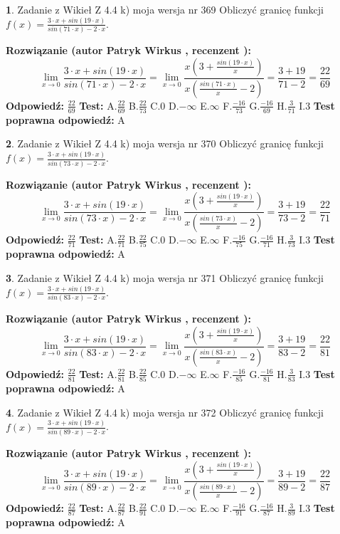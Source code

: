 \documentclass[12pt, a4paper]{article}
\theoremstyle{definition} %
\newtheorem{zad}{}
\newcommand{\zadStart}[1]{\begin{zad}#1\newline}
\newcommand{\zadStop}{\end{zad}}
\newcommand{\rozwStart}[2]{\noindent \textbf{Rozwiązanie (autor #1 , recenzent #2): }\newline}
\newcommand{\rozwStop}{\newline}
\newcommand{\odpStart}{\noindent \textbf{Odpowiedź:}\newline}
\newcommand{\odpStop}{\newline}
\newcommand{\testStart}{\noindent \textbf{Test:}\newline}
\newcommand{\testStop}{\newline}
\newcommand{\kluczStart}{\noindent \textbf{Test poprawna odpowiedź:}\newline}
\newcommand{\kluczStop}{\newline}
\begin{document}
\zadStart{Zadanie z Wikieł Z 4.4 k) moja wersja nr 369}
Obliczyć granicę funkcji $f(x)=\frac{3\cdot x +sin(19\cdot x)}{sin(71\cdot x) -2\cdot x}$.
\zadStop
\rozwStart{Patryk Wirkus}{}
$$\lim\limits_{x\to 0}\frac{3\cdot x +sin(19\cdot x)}{sin(71\cdot x) -2\cdot x}
=\lim\limits_{x\to 0}\frac{x(3+\frac{sin(19\cdot x)}{x})}{x(\frac{sin(71\cdot x)}{x}-2)}
=\frac{3+19}{71-2} = \frac{22}{69}$$
\rozwStop
\odpStart
$\frac{22}{69}$
\odpStop
\testStart
A.$\frac{22}{69}$
B.$\frac{22}{73}$
C.$0$
D.$-\infty$
E.$\infty$
F.$\frac{-16}{73}$
G.$\frac{-16}{69}$
H.$\frac{3}{71}$
I.$3$
\testStop
\kluczStart
A
\kluczStop



\zadStart{Zadanie z Wikieł Z 4.4 k) moja wersja nr 370}
Obliczyć granicę funkcji $f(x)=\frac{3\cdot x +sin(19\cdot x)}{sin(73\cdot x) -2\cdot x}$.
\zadStop
\rozwStart{Patryk Wirkus}{}
$$\lim\limits_{x\to 0}\frac{3\cdot x +sin(19\cdot x)}{sin(73\cdot x) -2\cdot x}
=\lim\limits_{x\to 0}\frac{x(3+\frac{sin(19\cdot x)}{x})}{x(\frac{sin(73\cdot x)}{x}-2)}
=\frac{3+19}{73-2} = \frac{22}{71}$$
\rozwStop
\odpStart
$\frac{22}{71}$
\odpStop
\testStart
A.$\frac{22}{71}$
B.$\frac{22}{75}$
C.$0$
D.$-\infty$
E.$\infty$
F.$\frac{-16}{75}$
G.$\frac{-16}{71}$
H.$\frac{3}{73}$
I.$3$
\testStop
\kluczStart
A
\kluczStop



\zadStart{Zadanie z Wikieł Z 4.4 k) moja wersja nr 371}
Obliczyć granicę funkcji $f(x)=\frac{3\cdot x +sin(19\cdot x)}{sin(83\cdot x) -2\cdot x}$.
\zadStop
\rozwStart{Patryk Wirkus}{}
$$\lim\limits_{x\to 0}\frac{3\cdot x +sin(19\cdot x)}{sin(83\cdot x) -2\cdot x}
=\lim\limits_{x\to 0}\frac{x(3+\frac{sin(19\cdot x)}{x})}{x(\frac{sin(83\cdot x)}{x}-2)}
=\frac{3+19}{83-2} = \frac{22}{81}$$
\rozwStop
\odpStart
$\frac{22}{81}$
\odpStop
\testStart
A.$\frac{22}{81}$
B.$\frac{22}{85}$
C.$0$
D.$-\infty$
E.$\infty$
F.$\frac{-16}{85}$
G.$\frac{-16}{81}$
H.$\frac{3}{83}$
I.$3$
\testStop
\kluczStart
A
\kluczStop



\zadStart{Zadanie z Wikieł Z 4.4 k) moja wersja nr 372}
Obliczyć granicę funkcji $f(x)=\frac{3\cdot x +sin(19\cdot x)}{sin(89\cdot x) -2\cdot x}$.
\zadStop
\rozwStart{Patryk Wirkus}{}
$$\lim\limits_{x\to 0}\frac{3\cdot x +sin(19\cdot x)}{sin(89\cdot x) -2\cdot x}
=\lim\limits_{x\to 0}\frac{x(3+\frac{sin(19\cdot x)}{x})}{x(\frac{sin(89\cdot x)}{x}-2)}
=\frac{3+19}{89-2} = \frac{22}{87}$$
\rozwStop
\odpStart
$\frac{22}{87}$
\odpStop
\testStart
A.$\frac{22}{87}$
B.$\frac{22}{91}$
C.$0$
D.$-\infty$
E.$\infty$
F.$\frac{-16}{91}$
G.$\frac{-16}{87}$
H.$\frac{3}{89}$
I.$3$
\testStop
\kluczStart
A
\kluczStop
\end{document}
